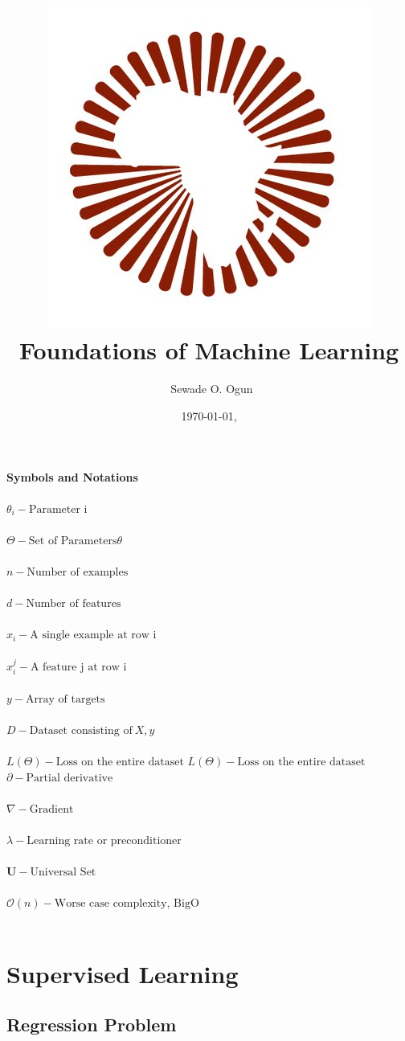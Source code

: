 \documentclass[12pt,a4paper,titlepage,landscape]{book}
\author{\text{A lesson note by}~Sewade O. Ogun}
\title{\includegraphics[width=0.3\linewidth]{logo} \\\textbf{Foundations of Machine Learning}
}
\date{\today, \text{AIMS Ghana}}
\begin{document}
	\maketitle
	\textbf{Symbols and Notations} \\\\
	$\theta_i - \text{Parameter i}$ \\\\
	$\Theta - \text{Set of Parameters} \theta$ \\\\
	$n - \text{Number of examples}$ \\\\
	$d - \text{Number of features}$ \\\\
	$x_i - \text{A single example at row i}$ \\\\
	$x_i^j - \text{A feature j at row i }$ \\\\
	$y - \text{Array of targets}$ \\\\
	$D - \text{Dataset consisting of}~X,y$ \\\\
	$L(\Theta)  - \text{Loss on the entire dataset}$
	$L(\Theta)  - \text{Loss on the entire dataset}$
	$\partial - \text{Partial derivative}$ \\\\
	$\nabla - \text{Gradient}$ \\\\
	$\lambda - \text{Learning rate or preconditioner}$ \\\\
	$\mathbf{U} - \text{Universal Set}$ \\\\
	$\mathcal{O}(n) - \text{Worse case complexity, BigO}$ \\\\
	\chapter{Supervised Learning}
	\section{Regression Problem}
	
\end{document}
